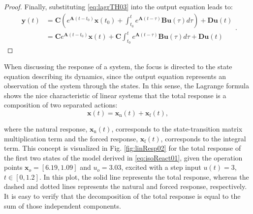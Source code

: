 \documentclass[a4paper,11pt]{book}
\numberwithin{figure}{chapter}
\numberwithin{equation}{chapter}
\numberwithin{table}{chapter}
\theoremstyle{definition}
\begin{document}
\begin{proof}
\noindent Finally, substituting \eqref{eq:lagrTH03} into the output equation leads to:
    \begin{equation} \label{eq:lagrTH04}
    \begin{split}
        \bm{y}(t) &= \bm{C} \left( e^{\bm{A} (t - t_0)} \bm{x}(t_0) + \int_{t_0}^{t} e^{\bm{A}(t - \tau)} \bm{B} \bm{u}(\tau) d\tau \right) + \bm{D} \bm{u}(t) \\ 
         &= \bm{C} e^{\bm{A}(t - t_0)} \bm{x}(t) + \bm{C} \int_{t_0}^{t} e^{\bm{A}(t - \tau)} \bm{B} \bm{u}(\tau) d \tau + \bm{D} \bm{u}(t) 
    \end{split}
    .\end{equation}
\end{proof}

When discussing the response of a system, the focus is directed to the state equation describing its dynamics, since the output equation represents an observation of the system through the states. In this sense, the Lagrange formula shows the nice characteristic of linear systems that the total response is a composition of two separated actions:
\begin{equation}
    \bm{x}(t) = \bm{x}_{\text{n}}(t) + \bm{x}_{\text{f}}(t) 
,\end{equation}

\noindent where the natural response, $\bm{x}_{\text{n}}(t)$, corresponds to the state-transition matrix multiplication term and the forced response, $\bm{x}_{\text{f}}(t)$, corresponds to the integral term. This concept is visualized in Fig. \ref{fig:linResp02} for the total response of the first two states of the model derived in \eqref{eq:isoReact01}, given the operation points $\bm{x}_o = [6.19, 1.09]$ and $u_o = 3.03$, excited with a step input $u(t) = 3$, $t \in [0, 1.2]$. In this plot, the solid line represents the total response, whereas the dashed and dotted lines represents the natural and forced response, respectively. It is easy to verify that the decomposition of the total response is equal to the sum of those independent components.
\end{document}

